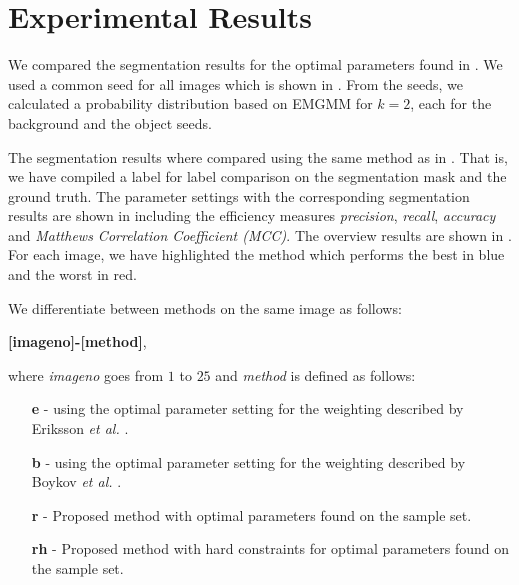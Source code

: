 \clearpage
\section{Experimental Results}
\label{sec:interactiveresults}

We compared the segmentation results for the optimal parameters found in . We used a common seed for all images which is shown in . From the seeds, we calculated a probability distribution based on EMGMM for $k=2$, each for the background and the object seeds.

The segmentation results where compared using the same method as in . That is, we have compiled a label for label comparison on the segmentation mask and the ground truth. The parameter settings with the corresponding segmentation results are shown in  including the efficiency measures \textit{precision}, \textit{recall}, \textit{accuracy} and \textit{Matthews Correlation Coefficient (MCC)}. The overview results are shown in . For each image, we have highlighted the method which performs the best in blue and the worst in red.

We differentiate between methods on the same image as follows:

\textbf{[imageno]-[method]}, 

where \textit{imageno} goes from $1$ to $25$ and \textit{method} is defined as follows:
\begin{enumerate}
	\item [\textbf{e}] - using the optimal parameter setting for the weighting described by Eriksson \textit{et al.} \citep{Eriksson2006}.
	\item [\textbf{b}] - using the optimal parameter setting for the weighting described by Boykov \textit{et al.} \citep{Boykov2001_2}.
	\item [\textbf{r}] - Proposed method with optimal parameters found on the sample set.
	\item [\textbf{rh}] - Proposed method with hard constraints for optimal parameters found on the sample set.
\end{enumerate}

